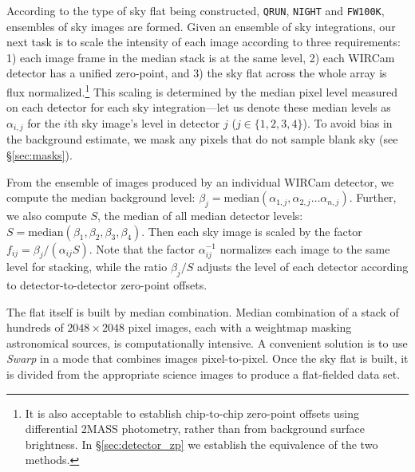 \documentclass[iop,tighten]{emulateapj}
\newcommand{\sw}[1]{\textit{#1}} %
\newcommand{\Fig}[1]{Fig.~\ref{fig:#1}}  %
\newcommand{\Sec}[1]{\S\ref{sec:#1}}  %
\begin{document}
According to the type of sky flat being constructed, \texttt{QRUN}, \texttt{NIGHT} and \texttt{FW100K}, ensembles of sky images are formed.
Given an ensemble of sky integrations, our next task is to scale the intensity of each image according to three requirements: 1) each image frame in the median stack is at the same level, 2) each WIRCam detector has a unified zero-point, and 3) the sky flat across the whole array is flux normalized.\footnote{It is also acceptable to establish chip-to-chip zero-point offsets using differential 2MASS photometry, rather than from background surface brightness. In \Sec{detector_zp} we establish the equivalence of the two methods.}
This scaling is determined by the median pixel level measured on each detector for each sky integration---let us denote these median levels as $\alpha_{i,j}$ for the $i$th sky image's level in detector $j$ ($j \in \{1, 2, 3, 4\}$).
To avoid bias in the background estimate, we mask any pixels that do not sample blank sky (see \Sec{masks}).

From the ensemble of images produced by an individual WIRCam detector, we compute the median background level: $\beta_j = \mathrm{median}(\alpha_{1,j}, \alpha_{2,j}\ldots \alpha_{n,j} )$.
Further, we also compute $S$, the median of all median detector levels: $S=\mathrm{median}(\beta_1, \beta_2, \beta_3, \beta_4)$.
Then each sky image is scaled by the factor $f_{ij} = \beta_j / (\alpha_{ij} S)$.
Note that the factor $\alpha_{ij}^{-1}$ normalizes each image to the same level for stacking, while the ratio $\beta_j / S$ adjusts the level of each detector according to detector-to-detector zero-point offsets.

The flat itself is built by median combination.
Median combination of a stack of hundreds of $2048\times2048$ pixel images, each with a weightmap masking astronomical sources, is computationally intensive.
A convenient solution is to use \sw{Swarp} \citep[an image-mosaicing software package,][]{Bertin:2002} in a mode that combines images pixel-to-pixel.
Once the sky flat is built, it is divided from the appropriate science images to produce a flat-fielded data set.
\end{document}
